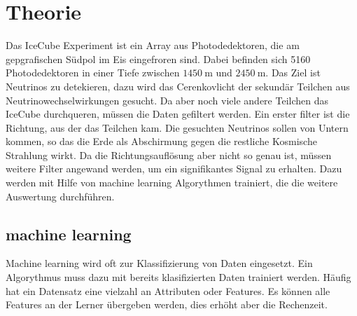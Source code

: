 \section{Theorie}
\label{sec:Theorie}
Das IceCube Experiment ist ein Array aus Photodedektoren, die am gepgrafischen Südpol im Eis eingefroren sind. Dabei befinden sich 5160 Photodedektoren
in einer Tiefe zwischen $\SI{1450}{\meter}$ und $\SI{2450}{\meter}$. Das Ziel ist Neutrinos zu detekieren, dazu wird das Cerenkovlicht der sekundär Teilchen
aus Neutrinowechselwirkungen gesucht. Da aber noch viele andere Teilchen das IceCube durchqueren, müssen die Daten gefiltert werden. Ein erster filter ist die
Richtung, aus der das Teilchen kam. Die gesuchten Neutrinos sollen von Untern kommen, so das die Erde als Abschirmung gegen die restliche Kosmische Strahlung
wirkt. Da die Richtungsauflösung aber nicht so genau ist, müssen weitere Filter angewand werden, um ein signifikantes Signal zu erhalten. Dazu werden mit Hilfe
von machine learning Algorythmen trainiert, die die weitere Auswertung durchführen.
\subsection{machine learning}
Machine learning wird oft zur Klassifizierung von Daten eingesetzt. Ein Algorythmus muss dazu mit bereits klasifizierten Daten trainiert werden. Häufig hat ein
Datensatz eine vielzahl an Attributen oder Features. Es können alle Features an der Lerner übergeben werden, dies erhöht aber die Rechenzeit. 
